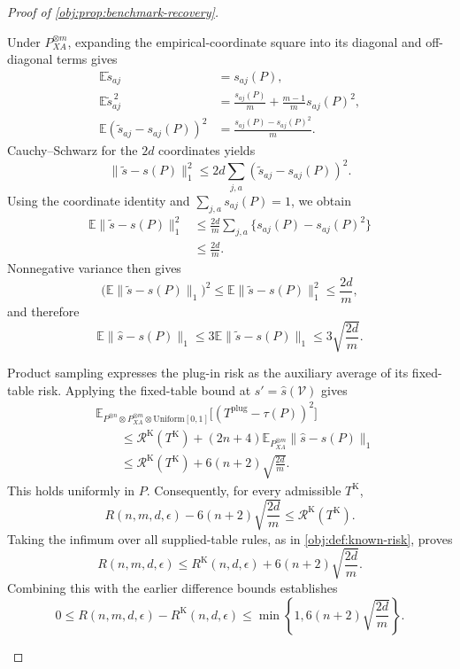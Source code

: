 \documentclass[11pt]{article}
\begin{document}
\begin{proof}[Proof of \cref{obj:prop:benchmark-recovery}]
\begin{enumerate}
Under \(P_{XA}^{\otimes m}\), expanding the empirical-coordinate square into its diagonal and off-diagonal terms gives
\[
\begin{aligned}
\mathbb E\widetilde s_{aj}&=s_{aj}(P),\\
\mathbb E\widetilde s_{aj}^{\,2}
&=\frac{s_{aj}(P)}m+\frac{m-1}{m}s_{aj}(P)^2,\\
\mathbb E(\widetilde s_{aj}-s_{aj}(P))^2
&=\frac{s_{aj}(P)-s_{aj}(P)^2}{m}.
\end{aligned}
\]
Cauchy--Schwarz for the \(2d\) coordinates yields
\[
\|\widetilde s-s(P)\|_1^2
\le2d\sum_{j,a}(\widetilde s_{aj}-s_{aj}(P))^2.
\]
Using the coordinate identity and \(\sum_{j,a}s_{aj}(P)=1\), we obtain
\[
\begin{aligned}
\mathbb E\|\widetilde s-s(P)\|_1^2
&\le\frac{2d}{m}
\sum_{j,a}\{s_{aj}(P)-s_{aj}(P)^2\}\\
&\le\frac{2d}{m}.
\end{aligned}
\]
Nonnegative variance then gives
\[
\bigl(\mathbb E\|\widetilde s-s(P)\|_1\bigr)^2
\le\mathbb E\|\widetilde s-s(P)\|_1^2
\le\frac{2d}{m},
\]
and therefore
\[
\mathbb E\|\widehat s-s(P)\|_1
\le3\mathbb E\|\widetilde s-s(P)\|_1
\le3\sqrt{\frac{2d}{m}}.
\]

Product sampling expresses the plug-in risk as the auxiliary average of its fixed-table risk. Applying the fixed-table bound at \(s'=\widehat s(\mathcal V)\) gives
\[
\begin{aligned}
&\mathbb E_{P^{\otimes n}\otimes P_{XA}^{\otimes m}
\otimes\mathrm{Uniform}[0,1]}
\bigl[(T^{\mathrm{plug}}-\tau(P))^2\bigr]\\
&\qquad\le
\mathscr R^{\mathrm K}(T^{\mathrm K})
+(2n+4)\mathbb E_{P_{XA}^{\otimes m}}\|\widehat s-s(P)\|_1\\
&\qquad\le
\mathscr R^{\mathrm K}(T^{\mathrm K})
+6(n+2)\sqrt{\frac{2d}{m}}.
\end{aligned}
\]
This holds uniformly in \(P\). Consequently, for every admissible \(T^{\mathrm K}\),
\[
R(n,m,d,\epsilon)-6(n+2)\sqrt{\frac{2d}{m}}
\le\mathscr R^{\mathrm K}(T^{\mathrm K}).
\]
Taking the infimum over all supplied-table rules, as in \cref{obj:def:known-risk}, proves
\[
R(n,m,d,\epsilon)
\le R^{\mathrm K}(n,d,\epsilon)
+6(n+2)\sqrt{\frac{2d}{m}}.
\]
Combining this with the earlier difference bounds establishes
\[
0\le R(n,m,d,\epsilon)-R^{\mathrm K}(n,d,\epsilon)
\le\min\left\{1,6(n+2)\sqrt{\frac{2d}{m}}\right\}.
\]


\end{enumerate}
\end{proof}
\end{document}
